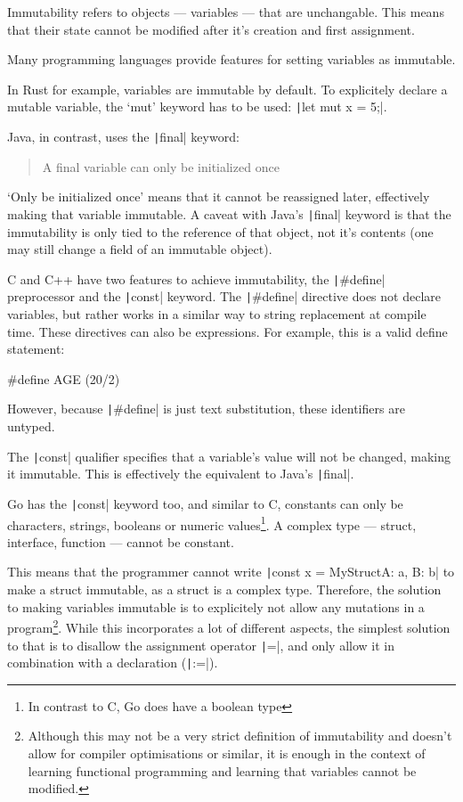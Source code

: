 Immutability refers to objects --- variables --- that are unchangable. This means
that their state cannot be modified after it's creation and first assignment.

Many programming languages provide features for setting variables as immutable.

In Rust for example, variables are immutable by default. To explicitely declare
a mutable variable, the `mut' keyword has to be used: \texttt|let mut x = 5;|.

Java, in contrast, uses the \texttt|final| keyword:
\begin{quote}
    A final variable can only be initialized once\autocite{final-java}
\end{quote}
`Only be initialized once' means that it cannot be reassigned later, effectively
making that variable immutable.
A caveat with Java's \texttt|final| keyword is that the immutability
is only tied to the reference of that object, not
it's contents (one may still change a field of an immutable object).

C and C++ have two features to achieve immutability, the \texttt|#define|
preprocessor and the \texttt|const| keyword.
The \texttt|#define| directive does not declare variables, but rather
works in a similar way to string replacement at compile time. These directives
can also be expressions. For example, this is a valid define statement:
\begin{ccode}
#define AGE (20/2)
\end{ccode}

However, because \texttt|#define| is just text substitution, these
identifiers are untyped.

The \texttt|const| qualifier specifies that a variable's value
will not be changed, making it immutable. This is effectively the equivalent
to Java's \texttt|final|.

Go has the \texttt|const| keyword too, and similar to C, constants can only be
characters, strings, booleans or numeric values\footnote{In contrast to C, Go does
have a boolean type}. A complex type --- struct, interface, function --- cannot be constant.

This means that the programmer cannot write
\texttt|const x = MyStruct{A: a, B: b}| to make a struct immutable,
as a struct is a complex type. Therefore, the solution to making variables
immutable is to explicitely not allow any mutations in a program\footnote{
    Although this may not be a very strict definition of immutability and doesn't
    allow for compiler optimisations or similar, it is enough in the context of
learning functional programming and learning that variables cannot be modified.}.
While this incorporates a lot of different aspects, the simplest solution
to that is to disallow the assignment operator \texttt|=|, and only
allow it in combination with a declaration (\texttt|:=|).

